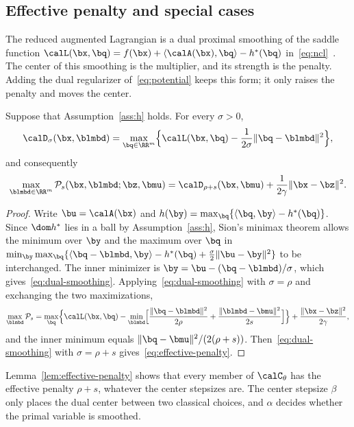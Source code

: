 \subsection{Effective penalty and special cases}
\label{subsec:effective-penalty}

The reduced augmented Lagrangian is a dual proximal smoothing of the saddle
function \(\calL(\bx,\bq)=f(\bx)+\langle\calA(\bx),\bq\rangle-h^*(\bq)\)
in~\eqref{eq:ncl}~\cite{rockafellar1976augmented}. The center of this
smoothing is the multiplier, and its strength is the penalty. Adding the dual
regularizer of~\eqref{eq:potential} keeps this form; it only raises the
penalty and moves the center.

\begin{lemma}
\label{lem:effective-penalty}
Suppose that Assumption~\ref{ass:h} holds. For every \(\sigma>0\),
\begin{equation}
    \calD_\sigma(\bx,\blmbd)
    =\max_{\bq\in\RR^m}\Bigl\{\calL(\bx,\bq)-\frac{1}{2\sigma}\|\bq-\blmbd\|^2\Bigr\},
    \label{eq:dual-smoothing}
\end{equation}
and consequently
\begin{equation}
    \max_{\blmbd\in\RR^m}\mathcal P_s(\bx,\blmbd;\bz,\bmu)
    =\calD_{\rho+s}(\bx,\bmu)+\frac{1}{2\gamma}\|\bx-\bz\|^2 .
    \label{eq:effective-penalty}
\end{equation}
\end{lemma}

\begin{proof}
Write \(\bu=\calA(\bx)\) and \(h(\by)=\max_{\bq}\{\langle\bq,\by\rangle-h^*(\bq)\}\).
Since \(\dom h^*\) lies in a ball by Assumption~\ref{ass:h}, Sion's minimax
theorem allows the minimum over \(\by\) and the maximum over \(\bq\) in
\(\min_{\by}\max_{\bq}\{\langle\bq-\blmbd,\by\rangle-h^*(\bq)
+\frac{\sigma}{2}\|\bu-\by\|^2\}\) to be interchanged. The inner minimizer is
\(\by=\bu-(\bq-\blmbd)/\sigma\), which gives~\eqref{eq:dual-smoothing}.
Applying~\eqref{eq:dual-smoothing} with \(\sigma=\rho\) and exchanging the two
maximizations,
\[
    \max_{\blmbd}\mathcal P_s
    =\max_{\bq}\Bigl\{\calL(\bx,\bq)-\min_{\blmbd}\Bigl[\frac{\|\bq-\blmbd\|^2}{2\rho}
    +\frac{\|\blmbd-\bmu\|^2}{2s}\Bigr]\Bigr\}+\frac{\|\bx-\bz\|^2}{2\gamma},
\]
and the inner minimum equals \(\|\bq-\bmu\|^2/(2(\rho+s))\).
Then~\eqref{eq:dual-smoothing} with \(\sigma=\rho+s\)
gives~\eqref{eq:effective-penalty}.
\end{proof}

Lemma~\ref{lem:effective-penalty} shows that every member of
\(\calC_\theta\) has the effective penalty \(\rho+s\), whatever the center
stepsizes are. The center stepsize \(\beta\) only places the dual center
between two classical choices, and \(\alpha\) decides whether the primal
variable is smoothed.

